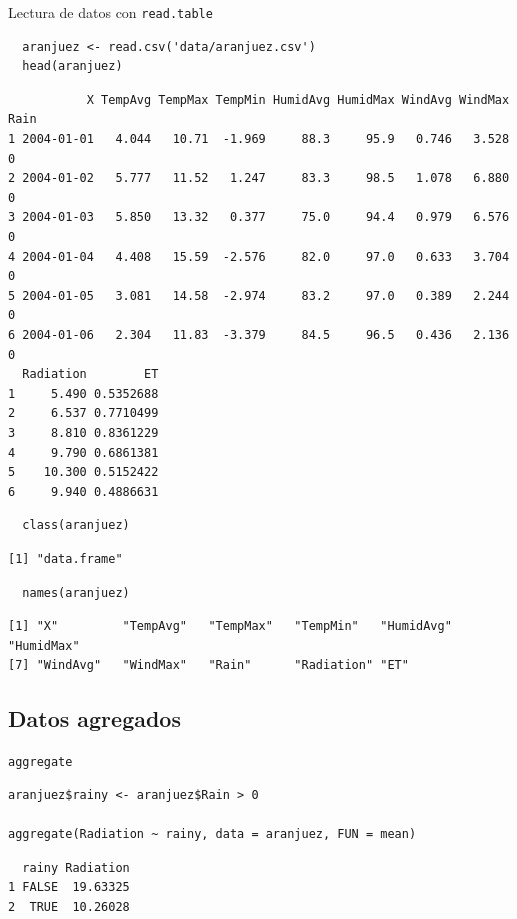 \documentclass[xcolor={usenames,svgnames,dvipsnames}]{beamer}
\begin{document}
\begin{frame}[fragile,label=sec-5-1-5]{Lectura de datos con \texttt{read.table}}
 \lstset{language=R,label= ,caption= ,numbers=none}
\begin{lstlisting}
  aranjuez <- read.csv('data/aranjuez.csv')
  head(aranjuez)
\end{lstlisting}

\begin{verbatim}
           X TempAvg TempMax TempMin HumidAvg HumidMax WindAvg WindMax Rain
1 2004-01-01   4.044   10.71  -1.969     88.3     95.9   0.746   3.528    0
2 2004-01-02   5.777   11.52   1.247     83.3     98.5   1.078   6.880    0
3 2004-01-03   5.850   13.32   0.377     75.0     94.4   0.979   6.576    0
4 2004-01-04   4.408   15.59  -2.576     82.0     97.0   0.633   3.704    0
5 2004-01-05   3.081   14.58  -2.974     83.2     97.0   0.389   2.244    0
6 2004-01-06   2.304   11.83  -3.379     84.5     96.5   0.436   2.136    0
  Radiation        ET
1     5.490 0.5352688
2     6.537 0.7710499
3     8.810 0.8361229
4     9.790 0.6861381
5    10.300 0.5152422
6     9.940 0.4886631
\end{verbatim}

\lstset{language=R,label= ,caption= ,numbers=none}
\begin{lstlisting}
  class(aranjuez)
\end{lstlisting}

\begin{verbatim}
[1] "data.frame"
\end{verbatim}

\lstset{language=R,label= ,caption= ,numbers=none}
\begin{lstlisting}
  names(aranjuez)
\end{lstlisting}

\begin{verbatim}
[1] "X"         "TempAvg"   "TempMax"   "TempMin"   "HumidAvg"  "HumidMax" 
[7] "WindAvg"   "WindMax"   "Rain"      "Radiation" "ET"
\end{verbatim}
\end{frame}

\subsection{Datos agregados}
\label{sec-5-2}
\begin{frame}[fragile,label=sec-5-2-1]{\texttt{aggregate}}
 \lstset{language=R,label= ,caption= ,numbers=none}
\begin{lstlisting}
aranjuez$rainy <- aranjuez$Rain > 0

aggregate(Radiation ~ rainy, data = aranjuez, FUN = mean)
\end{lstlisting}

\begin{verbatim}
  rainy Radiation
1 FALSE  19.63325
2  TRUE  10.26028
\end{verbatim}
\end{frame}
\end{document}
